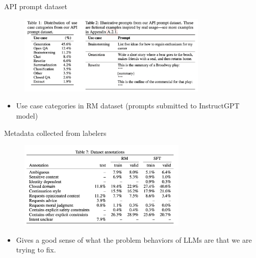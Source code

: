 \begin{vbframe}{API prompt dataset}

\vfill

\begin{figure}
\centering
\includegraphics[width = 9cm]{figure/apipromptdataset.png}
\end{figure}

\begin{itemize}
	\item Use case categories in RM dataset
        (prompts  submitted to
        InstructGPT model)
\end{itemize}



\vfill

\end{vbframe}


\begin{vbframe}{Metadata collected from labelers}

\vfill

\begin{figure}
\centering
\includegraphics[width = 8cm]{figure/instructgpttable3b.png}
\end{figure}

\begin{itemize}
	\item Gives a good sense of what the problem
	behaviors of LLMs are
	that we are trying to fix.
\end{itemize}

\vfill

\end{vbframe}

